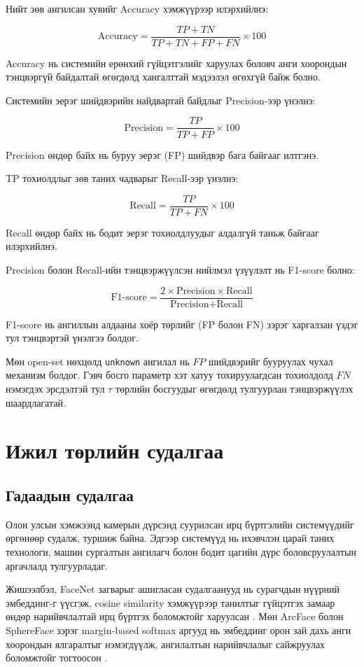 Нийт зөв ангилсан хувийг Accuracy хэмжүүрээр илэрхийлнэ:

\[
\text{Accuracy} = \frac{TP + TN}{TP + TN + FP + FN} \times 100
\]

Accuracy нь системийн ерөнхий гүйцэтгэлийг харуулах боловч анги хоорондын тэнцвэргүй байдалтай өгөгдөлд хангалттай мэдээлэл өгөхгүй байж болно.

Системийн эерэг шийдвэрийн найдвартай байдлыг Precision-ээр үнэлнэ:

\[
\text{Precision} = \frac{TP}{TP + FP} \times 100
\]

Precision өндөр байх нь буруу эерэг (FP) шийдвэр бага байгааг илтгэнэ.

TP тохиолдлыг зөв таних чадварыг Recall-ээр үнэлнэ:

\[
\text{Recall} = \frac{TP}{TP + FN} \times 100
\]

Recall өндөр байх нь бодит эерэг тохиолдлуудыг алдалгүй таньж байгааг илэрхийлнэ.

Precision болон Recall-ийн тэнцвэржүүлсэн нийлмэл үзүүлэлт нь F1-score болно:

\[
\text{F1-score} = \frac{2 \times \text{Precision} \times \text{Recall}}{\text{Precision} + \text{Recall}}
\]

F1-score нь ангиллын алдааны хоёр төрлийг (FP болон FN) зэрэг харгалзан үздэг тул тэнцвэртэй үнэлгээ болдог.

Мөн open-set нөхцөлд \texttt{unknown} ангилал нь $FP$ шийдвэрийг бууруулах чухал механизм болдог. Гэвч босго параметр хэт хатуу тохируулагдсан тохиолдолд $FN$ нэмэгдэх эрсдэлтэй тул $\tau$ төрлийн босгуудыг өгөгдөлд тулгуурлан тэнцвэржүүлэх шаардлагатай.
\section{Ижил төрлийн судалгаа}

\subsection{Гадаадын судалгаа}

Олон улсын хэмжээнд камерын дүрсэнд суурилсан ирц бүртгэлийн системүүдийг өргөнөөр судалж, туршиж байна. Эдгээр системүүд нь ихэвчлэн царай таних технологи, машин сургалтын ангилагч болон бодит цагийн дүрс боловсруулалтын аргачлалд тулгуурладаг.

Жишээлбэл, FaceNet загварыг ашигласан судалгаанууд нь сурагчдын нүүрний эмбеддинг-г үүсгэж, cosine similarity хэмжүүрээр танилтыг гүйцэтгэх замаар өндөр нарийвчлалтай ирц бүртгэх боломжтойг харуулсан \cite{schroff2015facenet}. Мөн ArcFace болон SphereFace зэрэг margin-based softmax аргууд нь эмбеддинг орон зай дахь анги хоорондын ялгаралтыг нэмэгдүүлж, ангилалтын нарийвчлалыг сайжруулах боломжтойг тогтоосон \cite{deng2019arcface, liao2017sphereface}.

